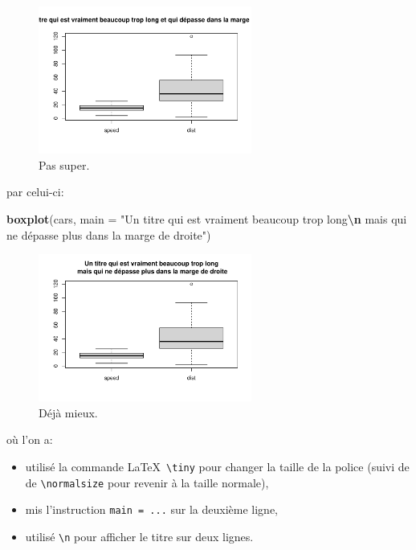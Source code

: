 \documentclass[mstat,12pt]{unswthesis}
\newenvironment{Shaded}{\begin{snugshade}}{\end{snugshade}}
\newcommand{\AttributeTok}[1]{\textcolor[rgb]{0.13,0.29,0.53}{#1}}
\newcommand{\FunctionTok}[1]{\textcolor[rgb]{0.13,0.29,0.53}{\textbf{#1}}}
\newcommand{\NormalTok}[1]{#1}
\newcommand{\SpecialCharTok}[1]{\textcolor[rgb]{0.81,0.36,0.00}{\textbf{#1}}}
\newcommand{\StringTok}[1]{\textcolor[rgb]{0.31,0.60,0.02}{#1}}
\begin{document}
\begin{figure}

{\centering \includegraphics[width=7cm]{scdon2-UPV-report-template_sansPython_files/figure-latex/unnamed-chunk-3-1} 

}

\caption{Pas super.}\label{fig:unnamed-chunk-3}
\end{figure}

par celui-ci:

\tiny

\begin{Shaded}
\begin{Highlighting}[]
\FunctionTok{boxplot}\NormalTok{(cars, }
        \AttributeTok{main =} \StringTok{"Un titre qui est vraiment beaucoup trop long}\SpecialCharTok{\textbackslash{}n}\StringTok{ mais qui ne dépasse plus dans la marge de droite"}\NormalTok{)}
\end{Highlighting}
\end{Shaded}

\begin{figure}

{\centering \includegraphics[width=7cm]{scdon2-UPV-report-template_sansPython_files/figure-latex/unnamed-chunk-4-1} 

}

\caption{Déjà mieux.}\label{fig:unnamed-chunk-4}
\end{figure}

\normalsize

où l'on a:

\begin{itemize}
\tightlist
\item
  utilisé la commande \LaTeX~\texttt{\textbackslash{}tiny} pour changer
  la taille de la police (suivi de de
  \texttt{\textbackslash{}normalsize} pour revenir à la taille normale),
\item
  mis l'instruction \texttt{main\ =\ ...} sur la deuxième ligne,
\item
  utilisé \texttt{\textbackslash{}n} pour afficher le titre sur deux
  lignes.
\end{itemize}
\end{document}
